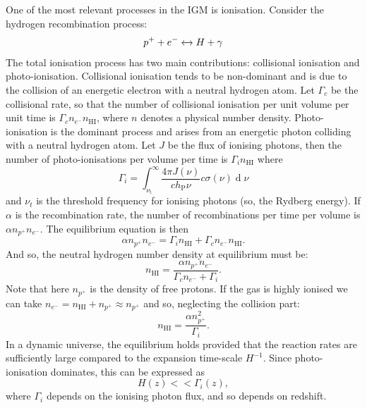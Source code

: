One of the most relevant processes in the IGM is ionisation. Consider the hydrogen recombination process:
$$p^+ + e^- \xleftrightarrow \ H +\gamma$$
The total ionisation process has two main contributions: collisional ionisation and photo-ionisation.
Collisional ionisation tends to be non-dominant and is due to the collision of an energetic electron with a neutral hydrogen atom. Let $\Gamma_c$ be the collisional rate, so that the number of collisional ionisation per unit volume per unit time is $\Gamma_c n_{e^-}n_\mathrm{HI}$, where $n$ denotes a physical number density. Photo-ionisation is the dominant process and arises from an energetic photon colliding with a neutral hydrogen atom. Let $J$ be the flux of ionising photons, then the number of photo-ionisations per volume per time is $\Gamma_i n_\mathrm{HI}$ where 
\begin{equation}
    \Gamma_i=\int_{\nu_\mathrm{t}}^\infty\frac{4\pi J(\nu)}{ch_\mathrm{P}\nu}c\sigma(\nu)\operatorname{d}\nu
\end{equation}
and $\nu_t$ is the threshold frequency for ionising photons (so, the Rydberg energy). If $\alpha$ is the recombination rate, the number of recombinations per time per volume is $\alpha n_{p^+}n_{e^-}$.
The equilibrium equation is then
\begin{equation}
    \alpha n_{p^+}n_{e^-}=\Gamma_i n_\mathrm{HI}+\Gamma_cn_{e^-}n_\mathrm{HI}.  
\end{equation}
And so, the neutral hydrogen number density at equilibrium must be:
\begin{equation}
    n_\mathrm{HI}=\frac{\alpha n_{p^+}n_{e^-}}{\Gamma_c n_{e^-}+\Gamma_i}.
\end{equation}
Note that here $n_{p^+}$ is the density of free protons. If the gas is highly ionised we can take $n_{e^-}=n_\mathrm{HI}+n_{p^+}\approx n_{p^+}$ and so, neglecting the collision part:
\begin{equation}
    n_\mathrm{HI}=\frac{\alpha n_{p^+}^2}{\Gamma_i}.
\end{equation}
In a dynamic universe, the equilibrium holds provided that the reaction rates are sufficiently large compared to the expansion time-scale $H^{-1}$. Since photo-ionisation dominates, this can be expressed as 
\begin{equation}
    H(z)<< \Gamma_i(z),
\end{equation}
where $\Gamma_i$ depends on the ionising photon flux, and so depends on redshift.
















